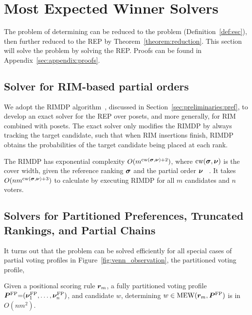 \section{Most Expected Winner Solvers}
\label{sec:algorithms}

The problem of determining \mew can be reduced to the \esc problem (Definition~\ref{def:esc}), then further reduced to the REP by Theorem~\ref{theorem:reduction}.
This section will solve the \mew problem by solving the REP.
Proofs can be found in Appendix~\ref{sec:appendix:proofs}.

\subsection{Solver for RIM-based partial orders}
\label{sec:algorithms:exact}

We adopt the RIMDP algorithm~\cite{DBLP:conf/aaai/KenigIPKS18}, discussed in Section~\ref{sec:preliminaries:pref}, to develop an exact solver for the REP over posets, and more generally, for RIM combined with posets. The exact solver only modifies the RIMDP by always tracking the target candidate, such that when RIM insertions finish, RIMDP obtains the probabilities of the target candidate being placed at each rank.

The RIMDP has exponential complexity $O(m^{\text{cw}(\bm{\sigma}, \bm{\nu})+2})$, where $\text{cw}(\bm{\sigma}, \bm{\nu})$ is the cover width, given the reference ranking $\bm{\sigma}$ and the partial order $\bm{\nu}$ ~\cite{DBLP:conf/aaai/KenigIPKS18}. It takes $O(nm^{\text{cw}(\bm{\sigma}, \bm{\nu})+3})$ to calculate \mew by executing RIMDP for all $m$ candidates and $n$ voters. 

\subsection{Solvers for Partitioned Preferences, Truncated Rankings,  and Partial Chains} 

It turns out that the \mew problem can be solved efficiently for all special cases of partial voting profiles in Figure~\ref{fig:venn_observation}, \ie the partitioned voting profile, 

\def\theoremTractabilityOfFP{
  Given a positional scoring rule $\vr_m$, a fully partitioned voting profile $\fullparVP {=} (\enum[n]{\fullpar})$, and candidate $w$, determining $w \in \mew(\vr_m, \fullparVP)$ is in $O(nm^2)$.
}

\begin{theorem} \label{theorem:tractability_of_fullparVP}
     \theoremTractabilityOfFP
\end{theorem}

